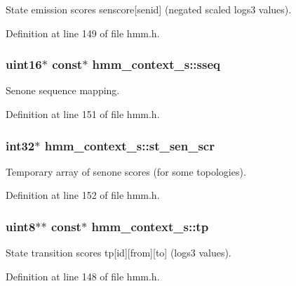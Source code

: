 State emission scores senscore[senid] (negated scaled logs3 values). 



Definition at line 149 of file hmm.\-h.

\subsubsection[{sseq}]{\setlength{\rightskip}{0pt plus 5cm}uint16$\ast$ const$\ast$ hmm\-\_\-context\-\_\-s\-::sseq}\label{structhmm__context__s_abbb0a32aadcc1938d9f21b04204c52da}


Senone sequence mapping. 



Definition at line 151 of file hmm.\-h.

\subsubsection[{st\-\_\-sen\-\_\-scr}]{\setlength{\rightskip}{0pt plus 5cm}int32$\ast$ hmm\-\_\-context\-\_\-s\-::st\-\_\-sen\-\_\-scr}\label{structhmm__context__s_a671c02e0443f41914471a7acfac6125c}


Temporary array of senone scores (for some topologies). 



Definition at line 152 of file hmm.\-h.

\subsubsection[{tp}]{\setlength{\rightskip}{0pt plus 5cm}uint8$\ast$$\ast$ const$\ast$ hmm\-\_\-context\-\_\-s\-::tp}\label{structhmm__context__s_a9ef2d83f67525050bea8b05f8a118f44}


State transition scores tp[id][from][to] (logs3 values). 



Definition at line 148 of file hmm.\-h.

